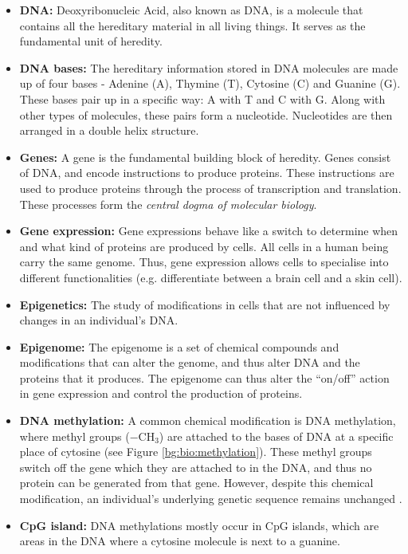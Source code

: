 \documentclass[12pt, twoside, a4paper]{report}
\begin{document}
\begin{itemize}
\item \textbf{DNA:} Deoxyribonucleic Acid, also known as DNA, is a molecule that contains all the hereditary material in all living things. It serves as the fundamental unit of heredity.

\item \textbf{DNA bases:} The hereditary information stored in DNA molecules are made up of four bases - Adenine (A), Thymine (T), Cytosine (C) and Guanine (G). These bases pair up in a specific way: A with T and C with G. Along with other types of molecules, these pairs form a nucleotide. Nucleotides are then arranged in a double helix structure.

\item \textbf{Genes:} A gene is the fundamental building block of heredity. Genes consist of DNA, and encode instructions to produce proteins. These instructions are used to produce proteins through the process of transcription and translation. These processes form the \textit{central dogma of molecular biology}.

\item \textbf{Gene expression:} Gene expressions behave like a switch to determine when and what kind of proteins are produced by cells. All cells in a human being carry the same genome. Thus, gene expression allows cells to specialise into different functionalities (e.g. differentiate between a brain cell and a skin cell).

\item \textbf{Epigenetics:} The study of modifications in cells that are not influenced by changes in an individual's DNA.

\item \textbf{Epigenome:} The epigenome is a set of chemical compounds and modifications that can alter the genome, and thus alter DNA and the proteins that it produces. The epigenome can thus alter the ``on/off'' action in gene expression and control the production of proteins.


\item \textbf{DNA methylation:} A common chemical modification is DNA methylation, where methyl groups ($-$CH$_3$) are attached to the bases of DNA at a specific place of cytosine (see Figure \ref{bg:bio:methylation}). These methyl groups switch off the gene which they are attached to in the DNA, and thus no protein can be generated from that gene. However, despite this chemical modification, an individual's underlying genetic sequence remains unchanged \cite{RefWorks:249}.

\item \textbf{CpG island:} DNA methylations mostly occur in CpG islands, which are areas in the DNA where a cytosine molecule is next to a guanine. 
\end{itemize}
\end{document}
